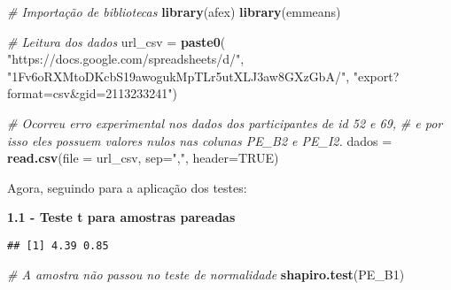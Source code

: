 \documentclass[
]{article}
\newenvironment{Shaded}{\begin{snugshade}}{\end{snugshade}}
\newcommand{\AttributeTok}[1]{\textcolor[rgb]{0.13,0.29,0.53}{#1}}
\newcommand{\CommentTok}[1]{\textcolor[rgb]{0.56,0.35,0.01}{\textit{#1}}}
\newcommand{\ConstantTok}[1]{\textcolor[rgb]{0.56,0.35,0.01}{#1}}
\newcommand{\DecValTok}[1]{\textcolor[rgb]{0.00,0.00,0.81}{#1}}
\newcommand{\FunctionTok}[1]{\textcolor[rgb]{0.13,0.29,0.53}{\textbf{#1}}}
\newcommand{\NormalTok}[1]{#1}
\newcommand{\OtherTok}[1]{\textcolor[rgb]{0.56,0.35,0.01}{#1}}
\newcommand{\SpecialCharTok}[1]{\textcolor[rgb]{0.81,0.36,0.00}{\textbf{#1}}}
\newcommand{\StringTok}[1]{\textcolor[rgb]{0.31,0.60,0.02}{#1}}
\begin{document}
\begin{Shaded}
\begin{Highlighting}[]
\CommentTok{\# Importação de bibliotecas}
\FunctionTok{library}\NormalTok{(afex)}
\FunctionTok{library}\NormalTok{(emmeans)}

\CommentTok{\# Leitura dos dados}
\NormalTok{url\_csv }\OtherTok{=} \FunctionTok{paste0}\NormalTok{(}
  \StringTok{"https://docs.google.com/spreadsheets/d/"}\NormalTok{,}
  \StringTok{"1Fv6oRXMtoDKcbS19awogukMpTLr5utXLJ3aw8GXzGbA/"}\NormalTok{,}
  \StringTok{"export?format=csv\&gid=2113233241"}\NormalTok{)}

\CommentTok{\# Ocorreu erro experimental nos dados dos participantes de id 52 e 69,}
\CommentTok{\# e por isso eles possuem valores nulos nas colunas PE\_B2 e PE\_I2.}
\NormalTok{dados }\OtherTok{=} \FunctionTok{read.csv}\NormalTok{(}\AttributeTok{file =}\NormalTok{ url\_csv, }\AttributeTok{sep=}\StringTok{","}\NormalTok{, }\AttributeTok{header=}\ConstantTok{TRUE}\NormalTok{)}
\end{Highlighting}
\end{Shaded}

Agora, seguindo para a aplicação dos testes:

\textbf{1.1 - Teste t para amostras pareadas}

\begin{Shaded}
\end{Shaded}

\begin{verbatim}
## [1] 4.39 0.85
\end{verbatim}

\begin{Shaded}
\begin{Highlighting}[]
\CommentTok{\# A amostra não passou no teste de normalidade}
\FunctionTok{shapiro.test}\NormalTok{(PE\_B1)}
\end{Highlighting}
\end{Shaded}
\end{document}
